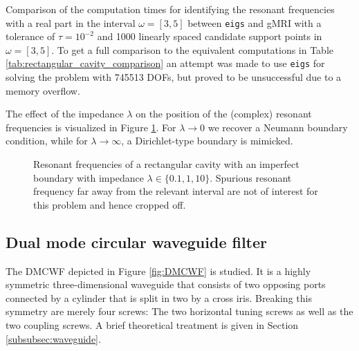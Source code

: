 \documentclass[11pt, a4paper]{article}
\begin{document}
\begin{table}[ht]
    \caption{Comparison of the computation times for identifying the resonant
    frequencies with a real part in the interval $\omega=[3, 5]$ between \texttt{eigs} and
    \acrshort{gMRI} with a tolerance of $\tau = 10^{-2}$ and 1000 linearly
    spaced candidate support points in $\omega=[3, 5]$. To get a full
    comparison to the equivalent computations in Table \ref{tab:rectangular_cavity_comparison}
    an attempt was made to use \texttt{eigs} for solving the problem with 
    745513 \acrshort{DOF}s, but proved to be unsuccessful due to a memory overflow.}
    \label{tab:imperfect-conductor-comparison}
    
\end{table}

The effect of the impedance $\lambda$ on the position of the (complex) resonant
frequencies is visualized in Figure \ref{fig:imperfect-conductor-eigfreqs}.
For $\lambda \to 0$ we recover a Neumann boundary condition, while for 
$\lambda \to \infty$, a Dirichlet-type boundary is mimicked.

\begin{figure}[ht]
    \centering
    
    \caption{Resonant frequencies of a rectangular cavity with an imperfect boundary
    with impedance $\lambda \in \{0.1, 1, 10\}$. Spurious resonant frequency far
    away from the relevant interval are not of interest for this problem and hence
    cropped off.}
    \label{fig:imperfect-conductor-eigfreqs}
\end{figure}

\clearpage
\subsection{Dual mode circular waveguide filter}
\label{subsec:examples-dmcwf}

The \acrfull{DMCWF} depicted in Figure \ref{fig:DMCWF} is studied. It is a
highly symmetric three-dimensional waveguide that consists of two opposing
ports connected by a cylinder that is split in two by a cross iris. 
Breaking this symmetry are merely four screws: The two horizontal tuning
screws as well as the two coupling screws. A brief theoretical treatment is given
in Section \ref{subsubsec:waveguide}.
\end{document}
